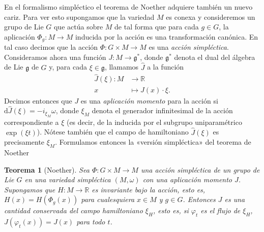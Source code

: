 \documentclass[11pt,a4paper,twoside]{article}
\newtheorem{thm}{Teorema}[section]
\theoremstyle{definition} \newtheorem{defn}[thm]{Definición}
\theoremstyle{definition} \newtheorem{ejemplo}[thm]{Ejemplo}
\theoremstyle{definition} \newtheorem{ejercicio}[thm]{Ejercicio}
\theoremstyle{remark} \newtheorem*{obs}{Observación}
\def\RR{\mathbb{R}}
\def\dd{\mathrm{d}}
\def\gg{\mathfrak{g}}
\begin{document}
En el formalismo simpléctico el teorema de Noether adquiere también un nuevo cariz. Para ver esto supongamos que la variedad $M$ es conexa y consideremos un grupo de Lie $G$ que actúa sobre $M$ de tal forma que para cada $g\in G$, la aplicación $\Phi_g:M\rightarrow M$ inducida por la acción es una transformación canónica. En tal caso decimos que la acción $\Phi:G\times M\rightarrow M$ es una \emph{acción simpléctica}. Consideramos ahora una función $J:M\rightarrow \gg^*$, donde $\gg^*$ denota el dual del álgebra de Lie $\gg$ de $G$ y, para cada $\xi\in \gg$, llamamos $\hat{J}$ a la función
\begin{align*}
  \hat{J}(\xi) :M&\longrightarrow \RR\\ 
     x &\longmapsto J(x)\cdot \xi.
  \end{align*}
  Decimos entonces que $J$ es una \emph{aplicación momento} para la acción si $\dd \hat{J}(\xi)=-i_{\xi_M}\omega$, donde $\xi_M$ denota el generador infinitesimal de la acción correspondiente a $\xi$ (es decir, de la inducida por el subgrupo uniparamétrico $\exp(\xi t)$). Nótese también que el campo de hamiltoniano $\hat{J}(\xi)$ es precisamente $\xi_M$. Formulamos entonces la «versión simpléctica» del teorema de Noether 
  \begin{thm}[Noether]
    Sea $\Phi:G\times M \rightarrow M$ una acción simpléctica de un grupo de Lie $G$ en una variedad simpléctica $(M,\omega)$ con una aplicación momento $J$. Supongamos que $H:M\rightarrow \RR$ es invariante bajo la acción, esto es, $H(x)=H(\Phi_g(x))$ para cualesquiera $x\in M$ y $g\in G$. Entonces $J$ es una cantidad conservada del campo hamiltoniano $\xi_H$, esto es, si $\varphi_t$ es el flujo de $\xi_H$, $J(\varphi_t(x))=J(x)$ para todo $t$.
  \end{thm}
\end{document}
